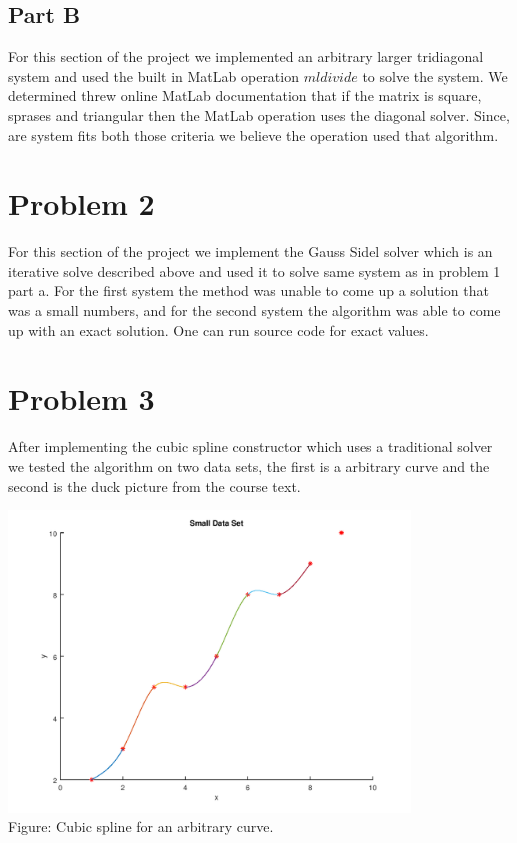 \documentclass{article}
\begin{document}
\subsection*{Part B}
For this section of the project we implemented an arbitrary larger tridiagonal system and used the built in MatLab operation $mldivide$ to solve the system. We determined threw online MatLab documentation that if the matrix is square, sprases and triangular then the MatLab operation uses the diagonal solver. Since, are system fits both those criteria we believe the operation used that algorithm.  

\section*{Problem 2}
For this section of the project we implement the Gauss Sidel solver which is an iterative solve described above and used it to solve same system as in problem 1 part a. For the first system the method was unable to come up a solution that was a small numbers, and for the second system the algorithm was able to come up with an exact solution. One can run source code for exact values. 

\section*{Problem 3}
After implementing the cubic spline constructor which uses a traditional solver we tested the algorithm on two data sets, the first is a arbitrary curve and the second is the duck picture from the course text.  

\includegraphics[height=8cm]{problem3a.png}\\
Figure: Cubic spline for an arbitrary curve.
\end{document}
